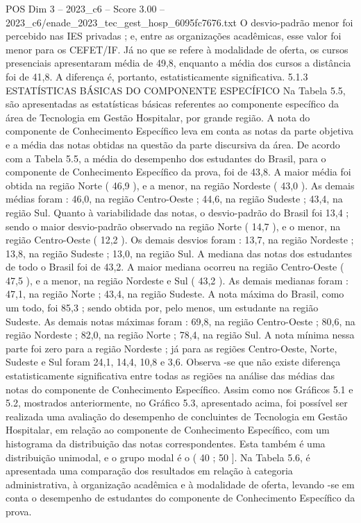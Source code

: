 \begin{textsample}{POS Dim 3 – 2023\_c6 – Score 3.00 – 2023\_c6/enade\_2023\_tec\_gest\_hosp\_6095fc7676.txt}
O desvio-padrão menor foi percebido nas IES privadas ; e, entre as organizações acadêmicas, esse valor foi menor para os CEFET/IF.
Já no que se refere à modalidade de oferta, os cursos presenciais apresentaram média de 49,8, enquanto a média dos cursos a distância foi de 41,8.
A diferença é, portanto, estatisticamente significativa. 5.1.3 ESTATÍSTICAS BÁSICAS DO COMPONENTE ESPECÍFICO Na Tabela 5.5, são apresentadas as estatísticas básicas referentes ao componente específico da área de Tecnologia em Gestão Hospitalar, por grande região.
A nota do componente de Conhecimento Específico leva em conta as notas da parte objetiva e a média das notas obtidas na questão da parte discursiva da área.
De acordo com a Tabela 5.5, a média do desempenho dos estudantes do Brasil, para o componente de Conhecimento Específico da prova, foi de 43,8.
A maior média foi obtida na região Norte ( 46,9 ), e a menor, na região Nordeste ( 43,0 ).
As demais médias foram : 46,0, na região Centro-Oeste ; 44,6, na região Sudeste ; 43,4, na região Sul.
Quanto à variabilidade das notas, o desvio-padrão do Brasil foi 13,4 ; sendo o maior desvio-padrão observado na região Norte ( 14,7 ), e o menor, na região Centro-Oeste ( 12,2 ).
Os demais desvios foram : 13,7, na região Nordeste ; 13,8, na região Sudeste ; 13,0, na região Sul.
A mediana das notas dos estudantes de todo o Brasil foi de 43,2.
A maior mediana ocorreu na região Centro-Oeste ( 47,5 ), e a menor, na região Nordeste e Sul ( 43,2 ).
As demais medianas foram : 47,1, na região Norte ; 43,4, na região Sudeste.
A nota máxima do Brasil, como um todo, foi 85,3 ; sendo obtida por, pelo menos, um estudante na região Sudeste.
As demais notas máximas foram : 69,8, na região Centro-Oeste ; 80,6, na região Nordeste ; 82,0, na região Norte ; 78,4, na região Sul.
A nota mínima nessa parte foi zero para a região Nordeste ; já para as regiões Centro-Oeste, Norte, Sudeste e Sul foram 24,1, 14,4, 10,8 e 3,6.
Observa -se que não existe diferença estatisticamente significativa entre todas as regiões na análise das médias das notas do componente de Conhecimento Específico.
Assim como nos Gráficos 5.1 e 5.2, mostrados anteriormente, no Gráfico 5.3, apresentado acima, foi possível ser realizada uma avaliação do desempenho de concluintes de Tecnologia em Gestão Hospitalar, em relação ao componente de Conhecimento Específico, com um histograma da distribuição das notas correspondentes.
Esta também é uma distribuição unimodal, e o grupo modal é o ( 40 ; 50 ].
Na Tabela 5.6, é apresentada uma comparação dos resultados em relação à categoria administrativa, à organização acadêmica e à modalidade de oferta, levando -se em conta o desempenho de estudantes do componente de Conhecimento Específico da prova.

\end{textsample}
